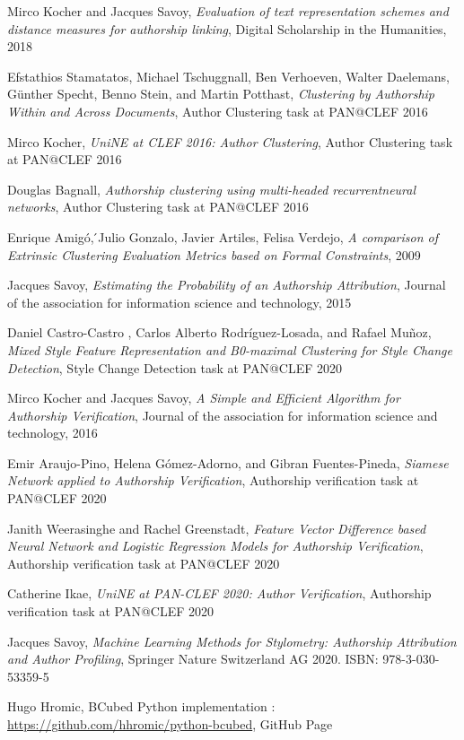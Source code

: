 \begin{thebibliography}{9}


Mirco Kocher and Jacques Savoy,
\textit{Evaluation of text representation schemes and distance measures for authorship linking},
Digital Scholarship in the Humanities, 2018

Efstathios Stamatatos, Michael Tschuggnall, Ben Verhoeven, Walter Daelemans, Günther Specht, Benno Stein, and Martin Potthast,
\textit{Clustering by Authorship Within and Across Documents},
Author Clustering task at PAN@CLEF 2016

Mirco Kocher,
\textit{UniNE at CLEF 2016: Author Clustering},
Author Clustering task at PAN@CLEF 2016

Douglas Bagnall,
\textit{Authorship clustering using multi-headed recurrentneural networks},
Author Clustering task at PAN@CLEF 2016


Enrique Amigó, ́Julio Gonzalo, Javier Artiles, Felisa Verdejo,
\textit{A comparison of Extrinsic Clustering Evaluation Metrics based on Formal Constraints},
2009

Jacques Savoy,
\textit{Estimating the Probability of an Authorship Attribution},
Journal of the association for information science and technology, 2015

Daniel Castro-Castro , Carlos Alberto Rodríguez-Losada, and Rafael Muñoz,
\textit{Mixed Style Feature Representation and B0-maximal Clustering for Style Change Detection},
Style Change Detection task at PAN@CLEF 2020

Mirco Kocher and Jacques Savoy,
\textit{A Simple and Efficient Algorithm for Authorship Verification},
Journal of the association for information science and technology, 2016

Emir Araujo-Pino, Helena Gómez-Adorno, and Gibran Fuentes-Pineda,
\textit{Siamese Network applied to Authorship Verification},
Authorship verification task at PAN@CLEF 2020

Janith Weerasinghe and Rachel Greenstadt,
\textit{Feature Vector Difference based Neural Network and Logistic Regression Models for Authorship Verification},
Authorship verification task at PAN@CLEF 2020

Catherine Ikae,
\textit{UniNE at PAN-CLEF 2020: Author Verification},
Authorship verification task at PAN@CLEF 2020

Jacques Savoy,
\textit{Machine Learning Methods for Stylometry: Authorship Attribution and Author Profiling},
Springer Nature Switzerland AG 2020. ISBN: 978-3-030-53359-5

Hugo Hromic,
BCubed Python implementation : \url{https://github.com/hhromic/python-bcubed},
GitHub Page

\end{thebibliography}
